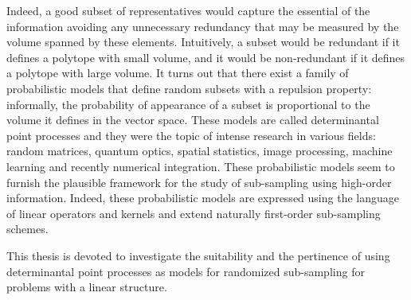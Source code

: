 \documentclass[twoside,11pt]{book}
\numberwithin{theorem}{chapter}
\numberwithin{definition}{chapter}
\numberwithin{proposition}{chapter}
\numberwithin{corollary}{chapter}
\numberwithin{example}{chapter}
\numberwithin{lemma}{chapter}
\numberwithin{assumption}{chapter}
\numberwithin{equation}{chapter}
\numberwithin{figure}{chapter}
\begin{document}
Indeed, a good subset of representatives would capture the essential of the information avoiding any unnecessary redundancy that may be measured by the volume spanned by these elements. Intuitively, a subset would be redundant if it defines a polytope with small volume, and it would be non-redundant if it defines a polytope with large volume. It turns out that there exist a family of probabilistic models that define random subsets with a repulsion property: informally, the probability of appearance of a subset is proportional to the volume it defines in the vector space. These models are called determinantal point processes and they were the topic of intense research in various fields: random matrices, quantum optics, spatial statistics, image processing, machine learning and recently numerical integration. These probabilistic models seem to furnish the plausible framework for the study of sub-sampling using high-order information. Indeed, these probabilistic models are expressed using the language of linear operators and kernels and extend naturally first-order sub-sampling schemes.













This thesis is devoted to investigate the suitability and the pertinence of using determinantal point processes as models for randomized sub-sampling for problems with a linear structure.
\end{document}
